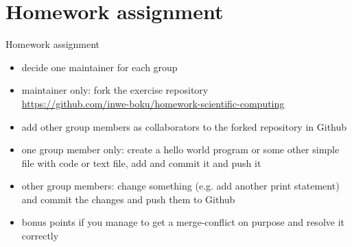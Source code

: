 \section{Homework assignment}

\begin{frame}[fragile]{Homework assignment}
    \begin{itemize}
        \item decide one maintainer for each group
        \item maintainer only: fork the exercise repository\\
            \href{https://github.com/inwe-boku/homework-scientific-computing}{https://github.com/inwe-boku/homework-scientific-computing}
        \item add other group members as collaborators to the forked repository in Github
        \item one group member only: create a hello world program or some other simple file with
            code or text file, add and commit it and push it
        \item other group members: change something (e.g. add another print statement) and commit
          the changes and push them to Github
        \item bonus points if you manage to get a merge-conflict on purpose and resolve it correctly
    \end{itemize}
\end{frame}



